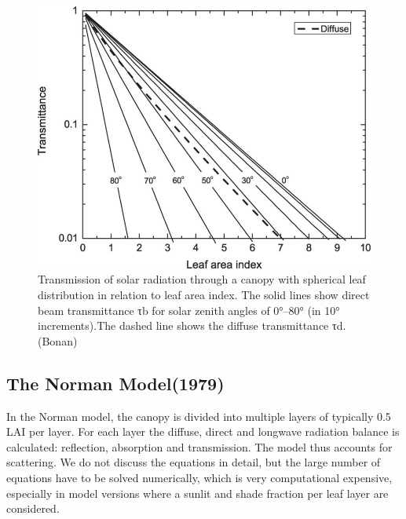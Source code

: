 \documentclass[
  12pt,
  oneside]{book}
\begin{document}
\begin{figure}

{\centering \includegraphics[width=0.8\linewidth]{figures/chap3/f318_diff_dir_trans} 

}

\caption{Transmission of solar radiation through a canopy with spherical leaf distribution in relation to leaf area index. The solid lines show direct beam transmittance τb for solar zenith angles of 0°–80° (in 10° increments).The dashed line shows the diffuse transmittance τd. (Bonan)}\label{fig:f318}
\end{figure}

\hypertarget{the-norman-model1979}{%
\subsection{The Norman Model(1979)}\label{the-norman-model1979}}

In the Norman model, the canopy is divided into multiple layers of typically 0.5 LAI per layer. For each layer the diffuse, direct and longwave radiation balance is calculated: reflection, absorption and transmission. The model thus accounts for scattering. We do not discuss the equations in detail, but the large number of equations have to be solved numerically, which is very computational expensive, especially in model versions where a sunlit and shade fraction per leaf layer are considered.
\end{document}
